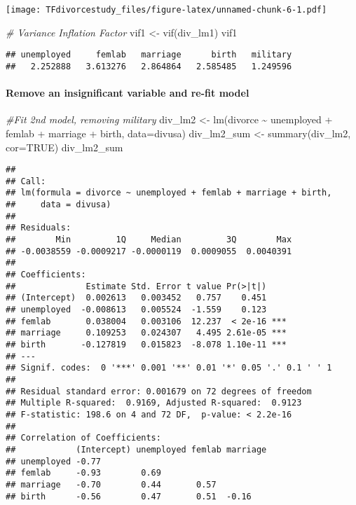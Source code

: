 \documentclass[
]{article}
\newenvironment{Shaded}{\begin{snugshade}}{\end{snugshade}}
\newcommand{\AttributeTok}[1]{\textcolor[rgb]{0.77,0.63,0.00}{#1}}
\newcommand{\CommentTok}[1]{\textcolor[rgb]{0.56,0.35,0.01}{\textit{#1}}}
\newcommand{\ConstantTok}[1]{\textcolor[rgb]{0.00,0.00,0.00}{#1}}
\newcommand{\FunctionTok}[1]{\textcolor[rgb]{0.00,0.00,0.00}{#1}}
\newcommand{\NormalTok}[1]{#1}
\newcommand{\OtherTok}[1]{\textcolor[rgb]{0.56,0.35,0.01}{#1}}
\newcommand{\SpecialCharTok}[1]{\textcolor[rgb]{0.00,0.00,0.00}{#1}}
\begin{document}
\texttt{[image: TFdivorcestudy\_files/figure-latex/unnamed-chunk-6-1.pdf]}

\begin{Shaded}
\begin{Highlighting}[]
\CommentTok{\# Variance Inflation Factor}
\NormalTok{vif1 }\OtherTok{\textless{}{-}} \FunctionTok{vif}\NormalTok{(div\_lm1)}
\NormalTok{vif1}
\end{Highlighting}
\end{Shaded}

\begin{verbatim}
## unemployed     femlab   marriage      birth   military 
##   2.252888   3.613276   2.864864   2.585485   1.249596
\end{verbatim}

\hypertarget{remove-an-insignificant-variable-and-re-fit-model}{%
\paragraph{Remove an insignificant variable and re-fit
model}\label{remove-an-insignificant-variable-and-re-fit-model}}

\begin{Shaded}
\begin{Highlighting}[]
\CommentTok{\#Fit 2nd model, removing military}
\NormalTok{div\_lm2 }\OtherTok{\textless{}{-}} \FunctionTok{lm}\NormalTok{(divorce }\SpecialCharTok{\textasciitilde{}}\NormalTok{ unemployed }\SpecialCharTok{+}\NormalTok{ femlab }\SpecialCharTok{+}\NormalTok{ marriage }\SpecialCharTok{+}\NormalTok{ birth, }\AttributeTok{data=}\NormalTok{divusa)}
\NormalTok{div\_lm2\_sum }\OtherTok{\textless{}{-}} \FunctionTok{summary}\NormalTok{(div\_lm2, }\AttributeTok{cor=}\ConstantTok{TRUE}\NormalTok{)}
\NormalTok{div\_lm2\_sum}
\end{Highlighting}
\end{Shaded}

\begin{verbatim}
## 
## Call:
## lm(formula = divorce ~ unemployed + femlab + marriage + birth, 
##     data = divusa)
## 
## Residuals:
##        Min         1Q     Median         3Q        Max 
## -0.0038559 -0.0009217 -0.0000119  0.0009055  0.0040391 
## 
## Coefficients:
##              Estimate Std. Error t value Pr(>|t|)    
## (Intercept)  0.002613   0.003452   0.757    0.451    
## unemployed  -0.008613   0.005524  -1.559    0.123    
## femlab       0.038004   0.003106  12.237  < 2e-16 ***
## marriage     0.109253   0.024307   4.495 2.61e-05 ***
## birth       -0.127819   0.015823  -8.078 1.10e-11 ***
## ---
## Signif. codes:  0 '***' 0.001 '**' 0.01 '*' 0.05 '.' 0.1 ' ' 1
## 
## Residual standard error: 0.001679 on 72 degrees of freedom
## Multiple R-squared:  0.9169, Adjusted R-squared:  0.9123 
## F-statistic: 198.6 on 4 and 72 DF,  p-value: < 2.2e-16
## 
## Correlation of Coefficients:
##            (Intercept) unemployed femlab marriage
## unemployed -0.77                                 
## femlab     -0.93        0.69                     
## marriage   -0.70        0.44       0.57          
## birth      -0.56        0.47       0.51  -0.16
\end{verbatim}
\end{document}

